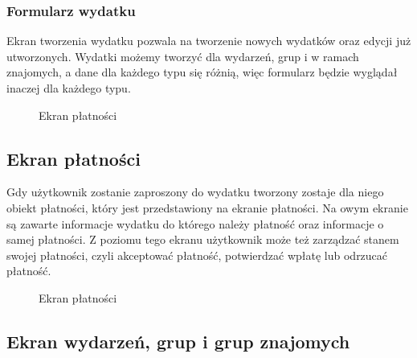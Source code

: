 \newpage
\subsubsection{Formularz wydatku}
Ekran tworzenia wydatku pozwala na tworzenie nowych wydatków oraz edycji już utworzonych. Wydatki możemy tworzyć dla wydarzeń, grup i w ramach znajomych, a dane dla każdego typu się różnią, więc formularz będzie wyglądał inaczej dla każdego typu.


\begin{figure}[h!]%
    \centering
    \qquad
    \qquad
    \caption{Ekran płatności}%
    \label{fig:example}%
\end{figure}

\newpage
\subsection{Ekran płatności}
Gdy użytkownik zostanie zaproszony do wydatku tworzony zostaje dla niego obiekt płatności, który jest przedstawiony na ekranie płatności. Na owym ekranie są zawarte informacje wydatku do którego należy płatność oraz informacje o samej płatności. Z poziomu tego ekranu użytkownik może też zarządzać stanem swojej płatności, czyli akceptować płatność, potwierdzać wpłatę lub odrzucać płatność.

\begin{figure}[h!]%
    \centering
    \qquad
    \qquad
    \qquad
    \caption{Ekran płatności}%
    \label{fig:example}%
\end{figure}

\newpage
\subsection{Ekran wydarzeń, grup i grup znajomych}
